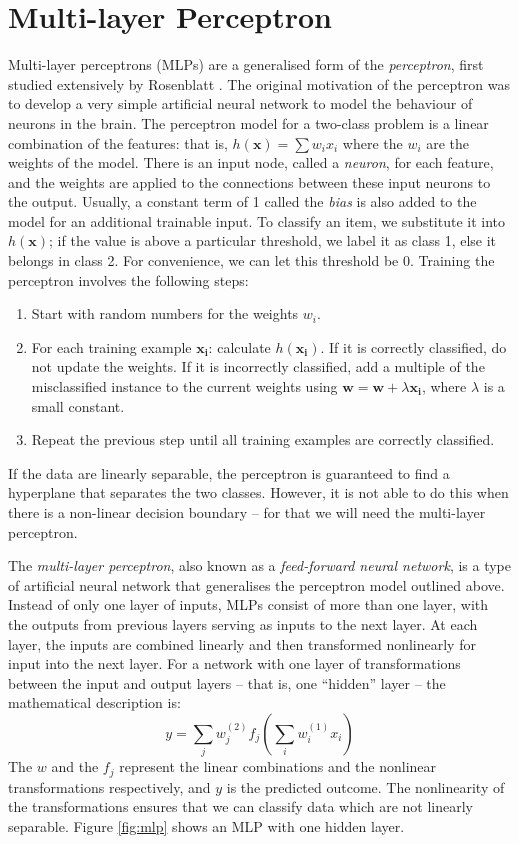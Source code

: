 \section{Multi-layer Perceptron}
Multi-layer perceptrons (MLPs) are a generalised form of the
\textit{perceptron}, first
studied extensively by Rosenblatt \cite{Rosenblatt1962}. The original
motivation of the perceptron 
was to develop a very simple artificial neural network to model the
behaviour of neurons in the brain. The perceptron model for a two-class
problem is a linear combination of the features: that is,
$h(\mathbf{x}) = \sum w_i x_i$ where the $w_i$ are the weights of the model.
There is an input node, called a \textit{neuron}, for each feature, and the
weights are applied to the connections between these input neurons to the
output.
Usually, a constant term of 1 called the \textit{bias} is also added to the
model for an additional trainable input. To classify an item, we substitute it
into $h(\mathbf{x})$; if the value is above a particular threshold, we label it
as class 1, else it belongs in class 2. For convenience, we can let this
threshold be 0. Training the perceptron involves the following steps:
\begin{enumerate}
\item Start with random numbers for the weights $w_i$.
\item For each training example $\mathbf{x_i}$: calculate $h(\mathbf{x_i})$.
If it is correctly classified, do not update the weights.
If it is incorrectly classified, add a multiple of the misclassified
instance to the current weights using
$\mathbf{w} = \mathbf{w} + \lambda \mathbf{x_i}$, where $\lambda$ is a small
constant.
\item Repeat the previous step until all training examples are correctly
classified.
\end{enumerate}
If the data are linearly separable, the perceptron is guaranteed to find a
hyperplane that separates the two classes. However, it is not able to do this
when there is a non-linear decision boundary -- for that we will need the
multi-layer perceptron.

The \textit{multi-layer perceptron}, also known as a
\textit{feed-forward neural network}, is a type of artificial neural network
that generalises the perceptron model outlined above. Instead of only one layer
of inputs, MLPs consist of more than one layer, with the outputs from previous
layers serving as inputs to the next layer. At each layer, the inputs are
combined linearly and then transformed nonlinearly for input into the next
layer. For a network with one layer of transformations between the input and
output layers -- that is, one ``hidden'' layer -- the mathematical description
is:
\begin{equation*}
y = \sum_j w^{(2)}_j f_j \left(\sum_i w^{(1)}_i x_i\right)
\end{equation*}
The $w$ and the $f_j$ represent the linear combinations and the nonlinear
transformations respectively, and $y$ is the predicted outcome.
The nonlinearity of the transformations ensures
that we can classify data which are not linearly separable. Figure
\ref{fig:mlp} shows an MLP with one hidden layer.

